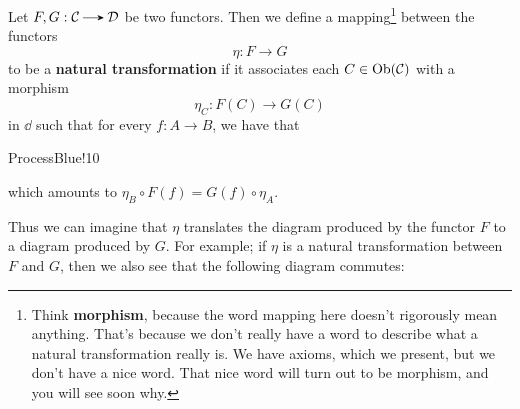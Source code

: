     \begin{definition}\label{definition:nat_trans}
        Let $F, G: \cc \to \dd$ be two functors. Then we define a
        mapping\footnote{Think \textbf{morphism}, because
        the word mapping here doesn't rigorously 
        mean anything. That's because 
        we don't really have a word to describe what a natural transformation 
        really is. We have axioms, which we present, but we don't have a nice word. 
        That nice word will turn out to be morphism, and you will see soon why. 
        } between the functors
        \[
            \eta: F \to G
        \] 
        to be a
        \textbf{natural transformation} if it associates each $C \in
        \operatorname{\mathrm{Ob}}(\mathcal{C})$ with a morphism
        \[
            \eta_C : F(C) \to G(C)
        \]
        in $\dd$ such that for every $f: A \to B$, we have that 
        \begin{statement}{ProcessBlue!10}
        \begin{center}
            \end{center}
        \end{statement}
        which amounts to $\eta_B \circ F(f) = G(f) \circ \eta_A$.
    \end{definition}
    Thus we can imagine that $\eta$ translates the diagram produced by
    the functor $F$ to a diagram produced by $G$. For example; if
    $\eta$ is a natural transformation between $F$ and $G$, then we
    also see that the following diagram commutes:
    \begin{center}
        \hspace{1cm}
    \end{center}
